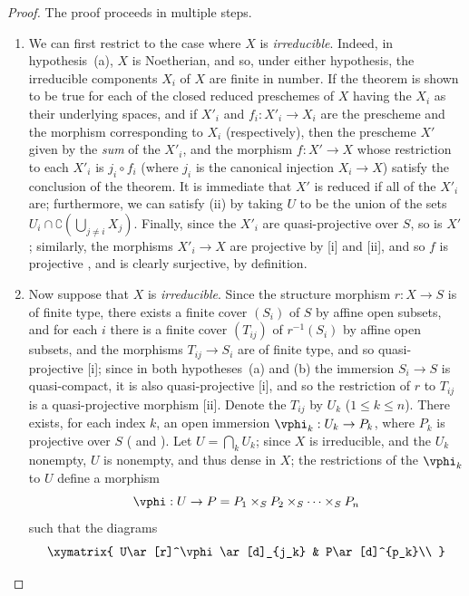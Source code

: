 \begin{proof}
The proof proceeds in multiple steps.
\begin{enumerate}
  \item[(A)] We can first restrict to the case where $X$ is \emph{irreducible}.
    Indeed, in hypothesis~(a), $X$ is Noetherian, and so, under either hypothesis, the irreducible components $X_i$ of $X$ are finite in number.
    If the theorem is shown to be true for each of the closed reduced preschemes of $X$ having the $X_i$ as their underlying spaces, and if $X'_i$ and $f_i:X'_i\to X_i$ are the prescheme and the morphism corresponding to $X_i$ (respectively), then the prescheme $X'$ given by the \emph{sum} of the $X'_i$, and the morphism $f:X'\to X$ whose restriction to each $X'_i$ is $j_i\circ f_i$ (where $j_i$ is the canonical injection $X_i\to X$) satisfy the conclusion of the theorem.
    It is immediate that $X'$ is reduced if all of the $X'_i$ are; furthermore, we can satisfy (ii) by taking $U$ to be the union of the sets $U_i\cap\complement\left(\bigcup_{j\neq i}X_j\right)$.
    Finally, since the $X'_i$ are quasi-projective over $S$, so is $X'$
    ; similarly, the morphisms $X'_i\to X$ are projective by [i] and [ii], and so $f$ is projective , and is clearly surjective, by definition.
  \item[(B)] Now suppose that $X$ is \emph{irreducible}.
    Since the structure morphism $r:X\to S$ is of finite type, there exists a finite cover $(S_i)$ of $S$ by affine open subsets, and for each $i$ there is a finite cover $(T_{ij})$ of $r^{-1}(S_i)$ by affine open subsets, and the morphisms $T_{ij}\to S_i$ are of finite type, and so quasi-projective [i];
    since in both hypotheses~(a) and (b) the immersion $S_i\to S$ is quasi-compact, it is also quasi-projective [i], and so the restriction of $r$ to $T_{ij}$ is a quasi-projective morphism [ii].
    Denote the $T_{ij}$ by $U_k$ ($1\leq k\leq n$).
    There exists, for each index $k$, an open immersion $\vphi_k:U_k\to P_k$, where $P_k$ is projective over $S$ ( and ).
    Let $U=\bigcap_k U_k$; since $X$ is irreducible, and the $U_k$ nonempty, $U$ is nonempty, and thus dense in $X$; the restrictions of the $\vphi_k$ to $U$ define a morphism
    \[
      \vphi:U\to P=P_1\times_S P_2\times_S\cdots\times_S P_n
    \]
    such that the diagrams
    \[
    \label{II.5.6.1.1}
      \xymatrix{
        U\ar[r]^\vphi\ar[d]_{j_k} &
        P\ar[d]^{p_k}\\
}\]
\end{enumerate}
\end{proof}
